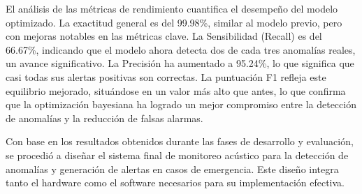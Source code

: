      El análisis de las métricas de rendimiento cuantifica el desempeño del modelo optimizado. La exactitud general es del 99.98\%, similar al modelo previo, pero con mejoras notables en las métricas clave. La Sensibilidad (Recall) es del 66.67\%, indicando que el modelo ahora detecta dos de cada tres anomalías reales, un avance significativo. La Precisión ha aumentado a 95.24\%, lo que significa que casi todas sus alertas positivas son correctas. La puntuación F1 refleja este equilibrio mejorado, situándose en un valor más alto que antes, lo que confirma que la optimización bayesiana ha logrado un mejor compromiso entre la detección de anomalías y la reducción de falsas alarmas.




Con base en los resultados obtenidos durante las fases de desarrollo y evaluación, se procedió a diseñar el sistema final de monitoreo acústico para la detección de anomalías y generación de alertas en casos de emergencia. Este diseño integra tanto el hardware como el software necesarios para su implementación efectiva.


